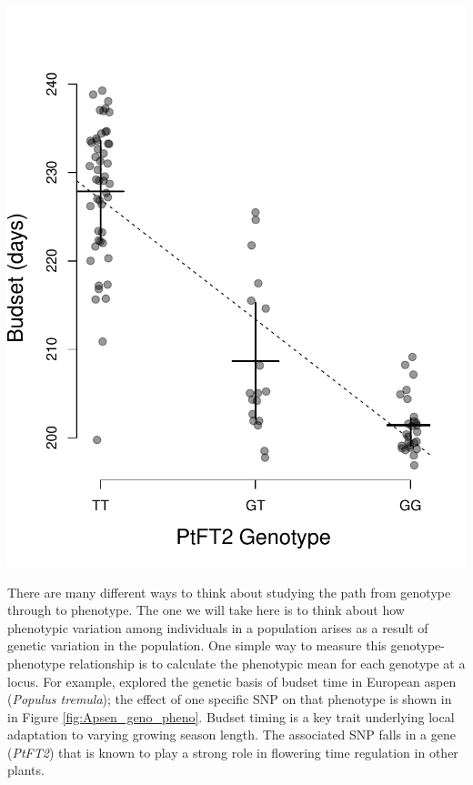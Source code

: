 \begin{marginfigure}[-1cm]
\begin{center}
\includegraphics[width=\textwidth]{Journal_figs/Quant_gen/Wang_GWAS_poplar/Poplar_Aspen_budset_geno_pheno.pdf}
\end{center}
\caption{The effect of a flowering time gene ({\it PtFT2}) SNP on budset time in European aspen. Each dot gives the genotype-phenotype combination for
  an individual. The horizontal lines give the budset mean for each
  genotype and the vertical lines show the inter-quartile range. The
  dotted line gives the linear regression of phenotype on genotype.
  Thanks to P{\"a}r Ingvarsson for sharing these data from  \citet{wang:18}. } \label{fig:Apsen_geno_pheno}
\end{marginfigure}

There are many different ways to think about studying the path from genotype through to phenotype. The one we will take here is to think about how phenotypic variation among individuals in a population arises as a result of genetic variation in the population.  One simple way to measure this genotype-phenotype relationship is to calculate the phenotypic mean for each genotype at a locus. For example, \citet{wang:18} explored the genetic basis of budset time in European aspen  ({\it Populus tremula}); the effect
of one specific SNP on that phenotype is shown in
in Figure \ref{fig:Apsen_geno_pheno}. Budset timing is a key trait underlying local adaptation to varying growing season length. The associated SNP
falls in a gene ({\it PtFT2}) that is known to play a strong role in flowering
time regulation in other plants. 


